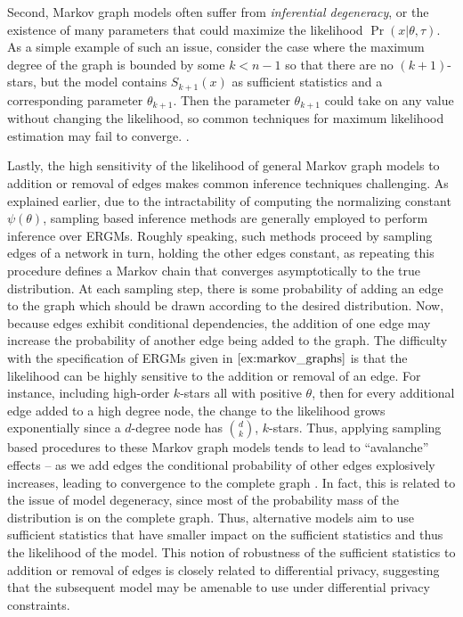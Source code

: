 Second, Markov graph models often suffer from \emph{inferential degeneracy}, or the existence of many parameters that could maximize the likelihood $\Pr(x | \theta, \tau)$. As a simple example of such an issue, consider the case where the maximum degree of the graph is bounded by some $k < n-1$ so that there are no $(k+1)$-stars, but the model contains $S_{k+1}(x)$ as sufficient statistics and a corresponding parameter $\theta_{k+1}$. Then the parameter $\theta_{k+1}$ could take on any value without changing the likelihood, so common techniques for maximum likelihood estimation may fail to converge. \cite{Han03}. 

Lastly, the high sensitivity of the likelihood of general Markov graph models to addition or removal of edges makes common inference techniques challenging. As explained earlier, due to the intractability of computing the normalizing constant $\psi(\theta)$, sampling based inference methods are generally employed to perform inference over ERGMs. Roughly speaking, such methods proceed by sampling edges of a network in turn, holding the other edges constant, as repeating this procedure defines a Markov chain that converges asymptotically to the true distribution. At each sampling step, there is some probability of adding an edge to the graph which should be drawn according to the desired distribution. Now, because edges exhibit conditional dependencies, the addition of one edge may increase the probability of another edge being added to the graph. The difficulty with the specification of ERGMs given in $\Cref{ex:markov_graphs}$ is that the likelihood can be highly sensitive to the addition or removal of an edge. For instance, including high-order $k$-stars all with positive $\theta$, then for every additional edge added to a high degree node, the change to the likelihood grows exponentially since a $d$-degree node has $\binom{d}{k}$, $k$-stars. Thus, applying sampling based procedures to these Markov graph models tends to lead to ``avalanche'' effects -- as we add edges the conditional probability of other edges explosively increases, leading to convergence to the complete graph \cite{Sni+06}. In fact, this is related to the issue of model degeneracy, since most of the probability mass of the distribution is on the complete graph. Thus, alternative models aim to use sufficient statistics that have smaller impact on the sufficient statistics and thus the likelihood of the model. This notion of robustness of the sufficient statistics to addition or removal of edges is closely related to differential privacy, suggesting that the subsequent model may be amenable to use under differential privacy constraints.

